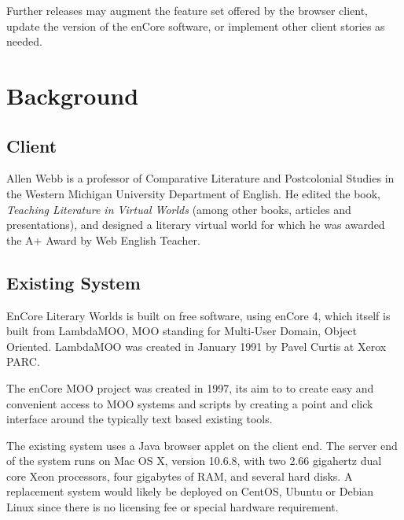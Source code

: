 \documentclass[12pt, letterpaper]{report}
\begin{document}
	

	\par
    Further releases may augment the feature set offered by the browser client, update the version of the enCore software, or implement other client stories as needed.
	\tableofcontents

	\chapter{Background}
	
	\section{Client}
	\par
	Allen Webb is a professor of Comparative Literature and Postcolonial Studies in the Western Michigan University Department of English. He edited the book, \textit{Teaching Literature in Virtual Worlds} (among other books, articles and presentations), and designed a literary virtual world for which he was awarded the A+ Award by Web English Teacher.
    	
	\section{Existing System}
	\par
	EnCore Literary Worlds is built on free software, using enCore 4, which itself is built from LambdaMOO, MOO standing for Multi-User Domain, Object Oriented. LambdaMOO was created in January 1991 by Pavel Curtis at Xerox PARC.\cite{Wired}
	
	\par 
	
		\par 
	The enCore MOO project was created in 1997, its aim to to create easy and convenient access to MOO systems and scripts by creating a point and click interface around the typically text based existing tools.

	\par
	The existing system uses a Java browser applet on the client end. The server end of the system runs on Mac OS X, version 10.6.8, with two 2.66 gigahertz dual core Xeon processors, four gigabytes of RAM, and several hard disks. A replacement system would likely be deployed on CentOS, Ubuntu or Debian Linux since there is no licensing fee or special hardware requirement.

	\par 
	
\end{document}
